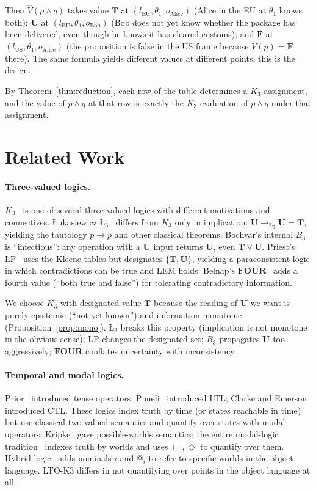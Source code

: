 \documentclass[11pt,a4paper]{article}
\theoremstyle{definition}
\theoremstyle{plain}
\theoremstyle{remark}
\newcommand{\Tv}{\mathbf{T}}
\newcommand{\Fv}{\mathbf{F}}
\newcommand{\Uv}{\mathbf{U}}
\newcommand{\Vh}{\widehat{V}}
\begin{document}
Then $\Vh(p \land q)$ takes value $\Tv$ at
$(l_{\mathrm{EU}}, \theta_1, o_{\mathrm{Alice}})$ (Alice in the EU at
$\theta_1$ knows both); $\Uv$ at $(l_{\mathrm{EU}}, \theta_1,
o_{\mathrm{Bob}})$ (Bob does not yet know whether the package has been
delivered, even though he knows it has cleared customs); and $\Fv$ at
$(l_{\mathrm{US}}, \theta_1, o_{\mathrm{Alice}})$ (the proposition is
false in the US frame because $\Vh(p) = \Fv$ there). The same formula
yields different values at different points: this is the design.

By Theorem~\ref{thm:reduction}, each row of the table determines a
$K_3$-assignment, and the value of $p \land q$ at that row is exactly the
$K_3$-evaluation of $p \land q$ under that assignment.

\section{Related Work}
\label{sec:related}

\paragraph{Three-valued logics.}
$K_3$~\cite{kleene1952} is one of several three-valued logics with
different motivations and connectives. {\L}ukasiewicz
$\text{\L}_3$~\cite{lukasiewicz1920} differs from $K_3$ only in
implication: $\Uv \to_{\text{\L}_3} \Uv = \Tv$, yielding the tautology
$p \to p$ and other classical theorems. Bochvar's internal
$B_3$~\cite{bochvar1981} is ``infectious'': any operation with a $\Uv$
input returns $\Uv$, even $\Tv \lor \Uv$. Priest's
LP~\cite{priest1979} uses the Kleene tables but designates
$\{\Tv, \Uv\}$, yielding a paraconsistent logic in which contradictions
can be true and LEM holds. Belnap's $\mathbf{FOUR}$~\cite{belnap1977}
adds a fourth value (``both true and false'') for tolerating
contradictory information.

We choose $K_3$ with designated value $\Tv$ because the reading of $\Uv$
we want is purely epistemic (``not yet known'') and information-monotonic
(Proposition~\ref{prop:mono}). $\text{\L}_3$ breaks this property
(implication is not monotone in the obvious sense); LP changes the
designated set; $B_3$ propagates $\Uv$ too aggressively; $\mathbf{FOUR}$
conflates uncertainty with inconsistency.

\paragraph{Temporal and modal logics.}
Prior~\cite{prior1957} introduced tense operators; Pnueli~\cite{pnueli1977}
introduced LTL; Clarke and Emerson~\cite{clarke1981} introduced CTL. These
logics index truth by time (or states reachable in time) but use
classical two-valued semantics and quantify over states with modal
operators. Kripke~\cite{kripke1963} gave possible-worlds semantics; the
entire modal-logic tradition~\cite{blackburn2001} indexes truth by worlds
and uses $\Box, \Diamond$ to quantify over them. Hybrid
logic~\cite{areces2007hybrid} adds nominals $i$ and $@_i$ to refer to
specific worlds in the object language. LTO-K3 differs in not
quantifying over points in the object language at all.
\end{document}
